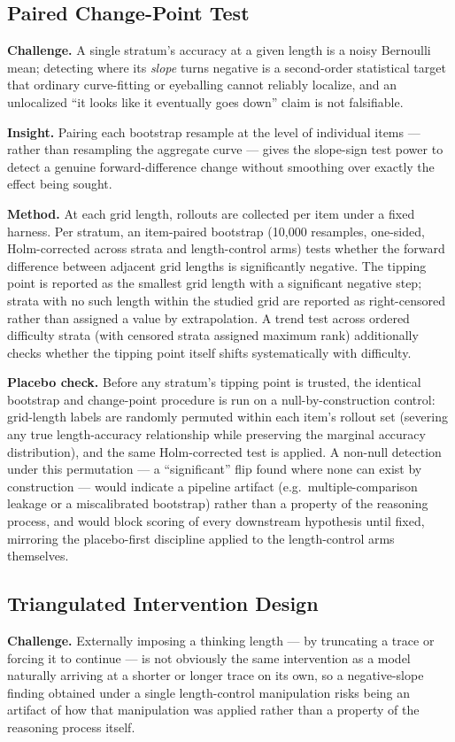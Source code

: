 \documentclass[11pt]{article}
\begin{document}
\subsection{Paired Change-Point Test}
\textbf{Challenge.} A single stratum's accuracy at a given length is a noisy Bernoulli mean; detecting where its \emph{slope} turns negative is a second-order statistical target that ordinary curve-fitting or eyeballing cannot reliably localize, and an unlocalized ``it looks like it eventually goes down'' claim is not falsifiable.

\textbf{Insight.} Pairing each bootstrap resample at the level of individual items --- rather than resampling the aggregate curve --- gives the slope-sign test power to detect a genuine forward-difference change without smoothing over exactly the effect being sought.

\textbf{Method.} At each grid length, rollouts are collected per item under a fixed harness. Per stratum, an item-paired bootstrap (10,000 resamples, one-sided, Holm-corrected across strata and length-control arms) tests whether the forward difference between adjacent grid lengths is significantly negative. The tipping point is reported as the smallest grid length with a significant negative step; strata with no such length within the studied grid are reported as right-censored rather than assigned a value by extrapolation. A trend test across ordered difficulty strata (with censored strata assigned maximum rank) additionally checks whether the tipping point itself shifts systematically with difficulty.

\textbf{Placebo check.} Before any stratum's tipping point is trusted, the identical bootstrap and change-point procedure is run on a null-by-construction control: grid-length labels are randomly permuted within each item's rollout set (severing any true length-accuracy relationship while preserving the marginal accuracy distribution), and the same Holm-corrected test is applied. A non-null detection under this permutation --- a ``significant'' flip found where none can exist by construction --- would indicate a pipeline artifact (e.g.\ multiple-comparison leakage or a miscalibrated bootstrap) rather than a property of the reasoning process, and would block scoring of every downstream hypothesis until fixed, mirroring the placebo-first discipline applied to the length-control arms themselves.

\subsection{Triangulated Intervention Design}
\textbf{Challenge.} Externally imposing a thinking length --- by truncating a trace or forcing it to continue --- is not obviously the same intervention as a model naturally arriving at a shorter or longer trace on its own, so a negative-slope finding obtained under a single length-control manipulation risks being an artifact of how that manipulation was applied rather than a property of the reasoning process itself.
\end{document}
